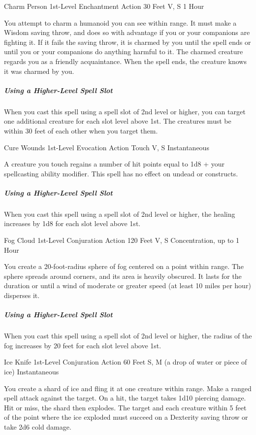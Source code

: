 \documentclass[letterpaper,openany,oneside,twocolumn]{book}
\begin{document}
\DndSpellHeader
  {Charm Person}
  {1st-Level Enchantment}
  {Action}
  {30 Feet}
  {V, S}
  {1 Hour}

You attempt to charm a humanoid you can see within range. It must make a Wisdom saving throw, and does so with advantage if you or your companions are fighting it. If it fails the saving throw, it is charmed by you until the spell ends or until you or your companions do anything harmful to it. The charmed creature regards you as a friendly acquaintance. When the spell ends, the creature knows it was charmed by you.

\subparagraph*{Using a Higher-Level Spell Slot} When you cast this spell using a spell slot of 2nd level or higher, you can target one additional creature for each slot level above 1st. The creatures must be within 30 feet of each other when you target them.

\DndSpellHeader
  {Cure Wounds}
  {1st-Level Evocation}
  {Action}
  {Touch}
  {V, S}
  {Instantaneous}

A creature you touch regains a number of hit points equal to 1d8 + your spellcasting ability modifier. This spell has no effect on undead or constructs.

\subparagraph*{Using a Higher-Level Spell Slot} When you cast this spell using a spell slot of 2nd level or higher, the healing increases by 1d8 for each slot level above 1st.

\DndSpellHeader
  {Fog Cloud}
  {1st-Level Conjuration}
  {Action}
  {120 Feet}
  {V, S}
  {Concentration, up to 1 Hour}

You create a 20-foot-radius sphere of fog centered on a point within range. The sphere spreads around corners, and its area is heavily obscured. It lasts for the duration or until a wind of moderate or greater speed (at least 10 miles per hour) disperses it.

\subparagraph*{Using a Higher-Level Spell Slot} When you cast this spell using a spell slot of 2nd level or higher, the radius of the fog increases by 20 feet for each slot level above 1st.

\DndSpellHeader
  {Ice Knife}
  {1st-Level Conjuration}
  {Action}
  {60 Feet}
  {S, M (a drop of water or piece of ice)}
  {Instantaneous}

You create a shard of ice and fling it at one creature within range. Make a ranged spell attack against the target. On a hit, the target takes 1d10 piercing damage. Hit or miss, the shard then explodes. The target and each creature within 5 feet of the point where the ice exploded must succeed on a Dexterity saving throw or take 2d6 cold damage.
\end{document}

